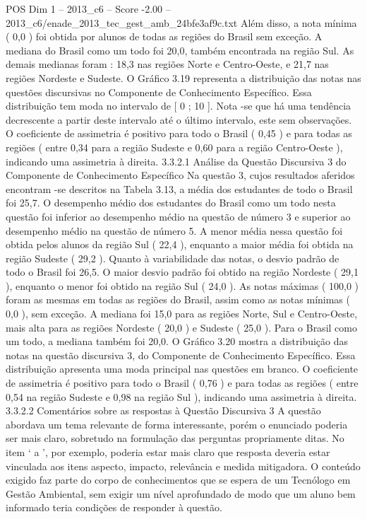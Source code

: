 \begin{textsample}{POS Dim 1 – 2013\_c6 – Score -2.00 – 2013\_c6/enade\_2013\_tec\_gest\_amb\_24bfe3af9c.txt}
Além disso, a nota mínima ( 0,0 ) foi obtida por alunos de todas as regiões do Brasil sem exceção.
A mediana do Brasil como um todo foi 20,0, também encontrada na região Sul.
As demais medianas foram : 18,3 nas regiões Norte e Centro-Oeste, e 21,7 nas regiões Nordeste e Sudeste.
O Gráfico 3.19 representa a distribuição das notas nas questões discursivas no Componente de Conhecimento Específico.
Essa distribuição tem moda no intervalo de [ 0 ; 10 ].
Nota -se que há uma tendência decrescente a partir deste intervalo até o último intervalo, este sem observações.
O coeficiente de assimetria é positivo para todo o Brasil ( 0,45 ) e para todas as regiões ( entre 0,34 para a região Sudeste e 0,60 para a região Centro-Oeste ), indicando uma assimetria à direita. 3.3.2.1 Análise da Questão Discursiva 3 do Componente de Conhecimento Específico Na questão 3, cujos resultados aferidos encontram -se descritos na Tabela 3.13, a média dos estudantes de todo o Brasil foi 25,7.
O desempenho médio dos estudantes do Brasil como um todo nesta questão foi inferior ao desempenho médio na questão de número 3 e superior ao desempenho médio na questão de número 5.
A menor média nessa questão foi obtida pelos alunos da região Sul ( 22,4 ), enquanto a maior média foi obtida na região Sudeste ( 29,2 ).
Quanto à variabilidade das notas, o desvio padrão de todo o Brasil foi 26,5.
O maior desvio padrão foi obtido na região Nordeste ( 29,1 ), enquanto o menor foi obtido na região Sul ( 24,0 ).
As notas máximas ( 100,0 ) foram as mesmas em todas as regiões do Brasil, assim como as notas mínimas ( 0,0 ), sem exceção.
A mediana foi 15,0 para as regiões Norte, Sul e Centro-Oeste, mais alta para as regiões Nordeste ( 20,0 ) e Sudeste ( 25,0 ).
Para o Brasil como um todo, a mediana também foi 20,0.
O Gráfico 3.20 mostra a distribuição das notas na questão discursiva 3, do Componente de Conhecimento Específico.
Essa distribuição apresenta uma moda principal nas questões em branco.
O coeficiente de assimetria é positivo para todo o Brasil ( 0,76 ) e para todas as regiões ( entre 0,54 na região Sudeste e 0,98 na região Sul ), indicando uma assimetria à direita. 3.3.2.2 Comentários sobre as respostas à Questão Discursiva 3 A questão abordava um tema relevante de forma interessante, porém o enunciado poderia ser mais claro, sobretudo na formulação das perguntas propriamente ditas.
No item ‘ a ’, por exemplo, poderia estar mais claro que resposta deveria estar vinculada aos itens aspecto, impacto, relevância e medida mitigadora.
O conteúdo exigido faz parte do corpo de conhecimentos que se espera de um Tecnólogo em Gestão Ambiental, sem exigir um nível aprofundado de modo que um aluno bem informado teria condições de responder à questão.

\end{textsample}
